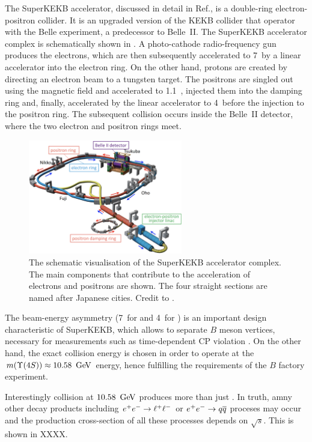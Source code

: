 The SuperKEKB accelerator, discussed in detail in Ref.\cite{Akai:2018mbz}, is a double-ring electron-positron collider.
It is an upgraded version of the KEKB collider \cite{Oide:2009zz} that operator with the Belle experiment, a predecessor to Belle~II.
The SuperKEKB accelerator complex is schematically shown in .
A photo-cathode radio-frequency gun produces the electrons, which are then subsequently accelerated to 7~\gev by a linear accelerator into the electron ring.
On the other hand, protons are created by directing an electron beam to a tungsten target.
The positrons are singled out using the magnetic field and accelerated to 1.1~\gev, injected them into the damping ring and, finally,
accelerated by the linear accelerator to 4~\gev before the injection to the positron ring.
The subsequent collision occurs inside the Belle~II detector, where the two electron and positron rings meet.
\begin{figure}[htbp!]
    \centering
    \includegraphics[width=0.6\textwidth]{figures/experimental_setup/super_kekb.png}
    \caption{\label{fig:superkekb}
        The schematic visualisation of the SuperKEKB accelerator complex.
        The main components that contribute to the acceleration of electrons and positrons are shown.
        The four straight sections are named after Japanese cities.
        Credit to \cite{Akai:2018mbz}.
    }
\end{figure}

The beam-energy asymmetry (7~\gev for \en and 4~\gev for \ep) is an important design characteristic of SuperKEKB, 
which allows to separate $B$ meson vertices, necessary for measurements such as time-dependent CP violation \cite{BaBar:2014omp}.
On the other hand, the exact collision energy is chosen in order to operate at the $m(\FourS)\approx10.58~\gev$ energy, 
hence fulfilling the requirements of the $B$ factory experiment.

Interestingly \epem collision at $10.58~\mathrm{\,Ge\kern -0.1em V}$ produces more than just \FourS.
In truth, amny other decay products including $e^+e^-\rightarrow\ell^+\ell^-$ or $e^+e^-\rightarrow q\overline q$ proceses may occur and the production 
cross-section  of all these processes depends on $\sqrt{s}$.
This is shown in XXXX.

